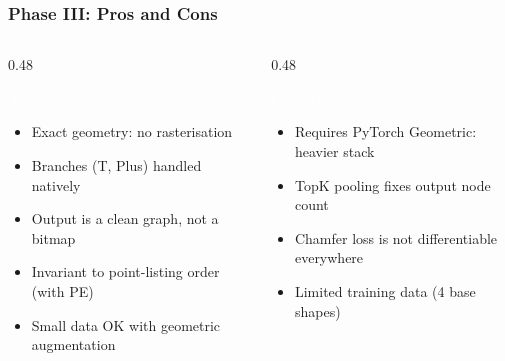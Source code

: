 

\begin{frame}[fragile]\frametitle{Phase III: Pros and Cons}
\begin{columns}[t]
  \begin{column}[T]{0.48\linewidth}
  \begin{block}{\textcolor{white}{Advantages}}
    \begin{itemize}
    \item[\tiny$\blacktriangleright$] Exact geometry: no rasterisation
    \item[\tiny$\blacktriangleright$] Branches (T, Plus) handled natively
    \item[\tiny$\blacktriangleright$] Output is a clean graph, not a bitmap
    \item[\tiny$\blacktriangleright$] Invariant to point-listing order (with PE)
    \item[\tiny$\blacktriangleright$] Small data OK with geometric augmentation
    \end{itemize}
  \end{block}
  \end{column}
  \begin{column}[T]{0.48\linewidth}
  \begin{alertblock}{\textcolor{white}{Limitations}}
    \begin{itemize}
    \item[\tiny$\blacktriangleright$] Requires PyTorch Geometric: heavier stack
    \item[\tiny$\blacktriangleright$] TopK pooling fixes output node count
    \item[\tiny$\blacktriangleright$] Chamfer loss is not differentiable everywhere
    \item[\tiny$\blacktriangleright$] Limited training data (4 base shapes)
    \end{itemize}
  \end{alertblock}
  \end{column}
\end{columns}
\end{frame}
